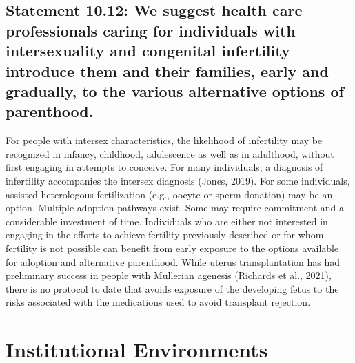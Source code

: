 \documentclass[
]{book}
\begin{document}
\hypertarget{statement-10.12-we-suggest-health-care-professionals-caring-for-individuals-with-intersexuality-and-congenital-infertility-introduce-them-and-their-families-early-and-gradually-to-the-various-alternative-options-of-parenthood.}{%
\section*{Statement 10.12: We suggest health care professionals caring for individuals with intersexuality and congenital infertility introduce them and their families, early and gradually, to the various alternative options of parenthood.}\label{statement-10.12-we-suggest-health-care-professionals-caring-for-individuals-with-intersexuality-and-congenital-infertility-introduce-them-and-their-families-early-and-gradually-to-the-various-alternative-options-of-parenthood.}}

For people with intersex characteristics, the
likelihood of infertility may be recognized in
infancy, childhood, adolescence as well as in
adulthood, without first engaging in attempts
to conceive. For many individuals, a diagnosis
of infertility accompanies the intersex diagnosis
(Jones, 2019). For some individuals, assisted
heterologous fertilization (e.g., oocyte or sperm
donation) may be an option. Multiple adoption
pathways exist. Some may require commitment
and a considerable investment of time.
Individuals who are either not interested in
engaging in the efforts to achieve fertility previously described or for whom fertility is not
possible can benefit from early exposure to the
options available for adoption and alternative
parenthood. While uterus transplantation has
had preliminary success in people with
Mullerian agenesis (Richards et al., 2021), there
is no protocol to date that avoids exposure of
the developing fetus to the risks associated with
the medications used to avoid transplant
rejection.

\hypertarget{institutional-environments}{%
\chapter{Institutional Environments}\label{institutional-environments}}
\end{document}
